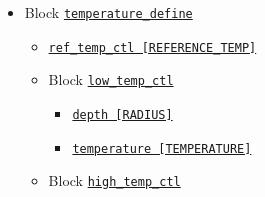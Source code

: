 \begin{itemize}
\begin{itemize}
\begin{itemize}
\begin{itemize}
				{\tt coef\_4\_m\_diffuse\_ctl [Name] [Power]}
			\item Array \hyperref[href_t:coef_4_induction_ctl]
				{\tt coef\_4\_induction\_ctl  [Name] [Power]}
			\end{itemize}
%
		\item Block \hyperref[href_t:composition]{\tt composition}
			\begin{itemize} \label{href_i:composition}
			\item Array \hyperref[href_t:coef_4_composition_ctl]
				{\tt coef\_4\_composition\_ctl         [Name] [Power]}
			\item Array \hyperref[href_t:coef_4_c_diffuse_ctl]
				{\tt coef\_4\_c\_diffuse\_ctl          [Name] [Power]}
			\item Array \hyperref[href_t:coef_4_composition_source_ctl]
				{\tt coef\_4\_composition\_source\_ctl [Name] [Power]}
			\end{itemize}
		\end{itemize}
%
%
%
	\item Block \hyperref[href_t:temperature_define]{\tt temperature\_define}
		\begin{itemize} \label{href_i:temperature_define}
		\item \verb||
				\hyperref[href_t:ref_temp_ctl]{\tt ref\_temp\_ctl        [REFERENCE\_TEMP]}
		\item Block \hyperref[href_t:low_temp_ctl]{\tt low\_temp\_ctl}
			\begin{itemize}
			\item \hyperref[href_t:depth]      {\tt depth        [RADIUS]}
			\item \hyperref[href_t:temperature]{\tt temperature  [TEMPERATURE]}
			\end{itemize}
%
		\item Block \hyperref[href_t:high_temp_ctl]{\tt high\_temp\_ctl}

\end{itemize}
\end{itemize}
\end{itemize}
